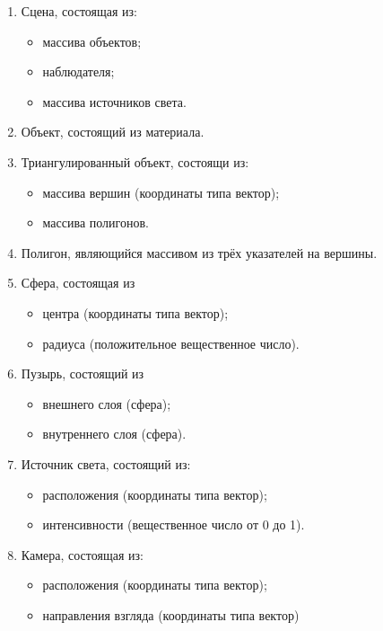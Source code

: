 \begin{enumerate}[label={\arabic*)}]
	\item Сцена, состоящая из:
    \begin{itemize}[label=---]
		\item массива объектов;
		\item наблюдателя;
		\item массива источников света.
	\end{itemize}

	\item Объект, состоящий из материала.
 
	\item Триангулированный объект, состоящи из: 
    \begin{itemize}[label=---]
		\item массива вершин (координаты типа вектор);
		\item массива полигонов.
	\end{itemize}
 
	\item Полигон, являющийся массивом из трёх указателей на вершины.
 
	\item Сфера, состоящая из
    \begin{itemize}[label=---]
		\item центра (координаты типа вектор);
		\item радиуса (положительное вещественное число).
	\end{itemize}

    \item Пузырь, состоящий из
    \begin{itemize}[label=---]
		\item внешнего слоя (сфера);
        \item внутреннего слоя (сфера).
	\end{itemize}
 
	\item Источник света, состоящий из:
    \begin{itemize}[label=---]
		\item расположения (координаты типа вектор);
		\item интенсивности (вещественное число от 0 до 1).
	\end{itemize}
 
	\item Камера, состоящая из:
    \begin{itemize}[label=---]
		\item расположения (координаты типа вектор);
		\item направления взгляда (координаты типа вектор)
	\end{itemize}
 

\end{enumerate}
